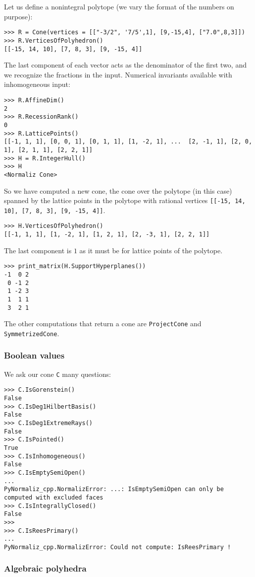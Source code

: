 \begin{small}
Let us define a nonintegral polytope (we vary the format of the numbers on purpose):
\begin{Verbatim}
>>> R = Cone(vertices = [["-3/2", '7/5',1], [9,-15,4], ["7.0",8,3]])
>>> R.VerticesOfPolyhedron()
[[-15, 14, 10], [7, 8, 3], [9, -15, 4]]
\end{Verbatim}
The last component of each vector acts as the denominator of the first two, and we recognize the fractions in the input. Numerical invariants available with inhomogeneous input:
\begin{Verbatim}
>>> R.AffineDim()
2
>>> R.RecessionRank()
0
>>> R.LatticePoints()
[[-1, 1, 1], [0, 0, 1], [0, 1, 1], [1, -2, 1], ...  [2, -1, 1], [2, 0, 1], [2, 1, 1], [2, 2, 1]]
>>> H = R.IntegerHull()
>>> H
<Normaliz Cone>
\end{Verbatim}
So we have computed a new cone, the cone over the polytope (in this case) spanned by the lattice points in the polytope with rational vertices \verb|[[-15, 14, 10], [7, 8, 3], [9, -15, 4]]|.
\begin{Verbatim}
>>> H.VerticesOfPolyhedron()
[[-1, 1, 1], [1, -2, 1], [1, 2, 1], [2, -3, 1], [2, 2, 1]]
\end{Verbatim}
The last component is $1$ as it must be for lattice points of the polytope.
\begin{Verbatim}
>>> print_matrix(H.SupportHyperplanes())
-1  0 2
 0 -1 2
 1 -2 3
 1  1 1
 3  2 1
\end{Verbatim}

The other computations that return a cone are \verb|ProjectCone| and \verb|SymmetrizedCone|.

\subsubsection{Boolean values}

We ask our cone \verb|C| many questions:
\begin{Verbatim}
>>> C.IsGorenstein()
False
>>> C.IsDeg1HilbertBasis()
False
>>> C.IsDeg1ExtremeRays()
False
>>> C.IsPointed()
True
>>> C.IsInhomogeneous()
False
>>> C.IsEmptySemiOpen()
...
PyNormaliz_cpp.NormalizError: ...: IsEmptySemiOpen can only be computed with excluded faces
>>> C.IsIntegrallyClosed()
False
>>> 
>>> C.IsReesPrimary()
...
PyNormaliz_cpp.NormalizError: Could not compute: IsReesPrimary !
\end{Verbatim}


\subsubsection{Algebraic polyhedra}


\end{small}
